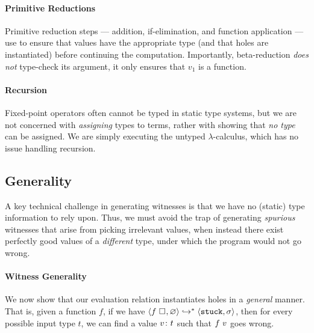 \paragraph{Primitive Reductions}
Primitive reduction steps --- addition, if-elimination, and
function application --- use \forcesym to ensure that values have the
appropriate type (and that holes are instantiated) before continuing the
computation. Importantly, beta-reduction \emph{does not} type-check its
argument, it only ensures that $v_1$ is a function.

\paragraph{Recursion}
Fixed-point operators often cannot be typed in static type systems, but
we are not concerned with \emph{assigning} types to terms, rather with
showing that \emph{no type} can be assigned. We are simply executing the
untyped $\lambda$-calculus, which has no issue handling recursion.


%
\subsection{Generality}\label{sec:soundness}

A key technical challenge in generating witnesses is
that we have no (static) type information to rely upon. Thus, we
must avoid the trap of generating \emph{spurious} witnesses that
arise from picking irrelevant values, when instead there exist
perfectly good values of a \emph{different} type, under which
the program would not go wrong.

\paragraph{Witness Generality}
We now show that our evaluation relation instantiates holes in a
\emph{general} manner. That is, given a function $f$, if we have
$\langle f \ \square_{}, \varnothing \rangle \hookrightarrow^{*} \langle \mathtt{stuck}, \sigma \rangle$, then for every
possible input type $t$, we can find a value ${v} \colon {t}$
such that $f \ v$ goes wrong.

